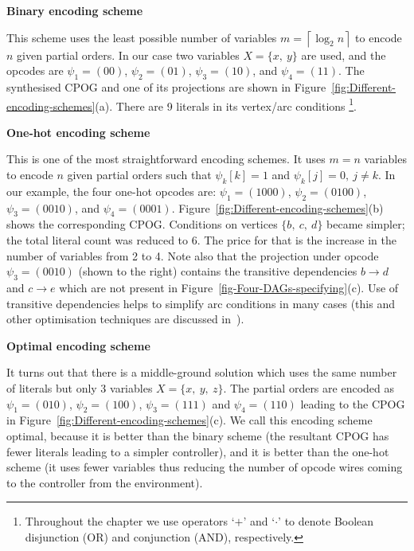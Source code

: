 \textbf{Binary encoding scheme}

This scheme uses the least possible number of variables $m=\left\lceil \log_{2}n\right\rceil $
to encode $n$ given partial orders. In our case two variables $X=\{x,\ y\}$
are used, and the opcodes are $\psi_{1}=(00)$, $\psi_{2}=(01)$,
$\psi_{3}=(10)$, and $\psi_{4}=(11)$. The synthesised CPOG and one
of its projections are shown in Figure~\ref{fig:Different-encoding-schemes}(a).
There are 9 literals in its vertex/arc conditions%
\footnote{Throughout the chapter we use operators `$+$' and `$\cdot$' to
denote Boolean disjunction (OR) and conjunction (AND), respectively.%
}.

\textbf{One-hot encoding scheme}

This is one of the most straightforward encoding schemes. It uses
$m=n$ variables to encode $n$ given partial orders such that $\psi_{k}[k]=1$
and $\psi_{k}[j]=0,\ j\neq k$. In our example, the four one-hot opcodes
are: $\psi_{1}=(1000)$, $\psi_{2}=(0100)$, $\psi_{3}=(0010)$, and
$\psi_{4}=(0001)$. Figure~\ref{fig:Different-encoding-schemes}(b)
shows the corresponding CPOG. Conditions on vertices $\{b,\ c,\ d\}$
became simpler; the total literal count was reduced to $6$. The price
for that is the increase in the number of variables from 2 to 4. Note
also that the projection under opcode $\psi_{3}=(0010)$ (shown to
the right) contains the transitive dependencies $b\rightarrow d$
and $c\rightarrow e$ which are not present in Figure~\ref{fig-Four-DAGs-specifying}(c).
Use of transitive dependencies helps to simplify arc conditions in
many cases (this and other optimisation techniques are discussed in~\cite{2010_mokhov_ieee}).

\textbf{Optimal encoding scheme}

It turns out that there is a middle-ground solution which uses the
same number of literals but only $3$ variables $X=\{x,\ y,\ z\}$.
The partial orders are encoded as $\psi_{1}=(010)$, $\psi_{2}=(100)$,
$\psi_{3}=(111)$ and $\psi_{4}=(110)$ leading to the CPOG in Figure~\ref{fig:Different-encoding-schemes}(c).
We call this encoding scheme optimal, because it is better than the
binary scheme (the resultant CPOG has fewer literals leading to a
simpler controller), and it is better than the one-hot scheme (it
uses fewer variables thus reducing the number of opcode wires coming
to the controller from the environment).

